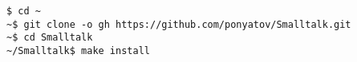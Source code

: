 \clearpage
{}\label{install}

\begin{verbatim}
$ cd ~
~$ git clone -o gh https://github.com/ponyatov/Smalltalk.git
~$ cd Smalltalk
~/Smalltalk$ make install
\end{verbatim}

